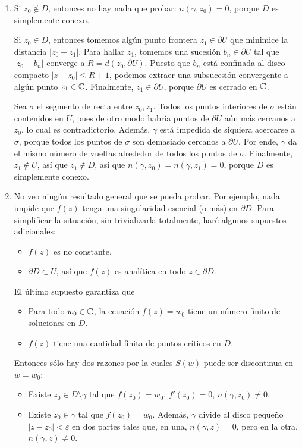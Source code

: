 \begin{solution}
\leavevmode
\begin{enumerate}[label=(\alph*)]
    \item Si $z_0 \notin D$, entonces no hay nada que probar: $n(\gamma, z_0) = 0$, porque $D$ es simplemente conexo.
    
    Si $z_0 \in D$, entonces tomemos algún punto frontera $z_1 \in \partial U$ que minimice la distancia $|z_0 - z_1|$. Para hallar $z_1$, tomemos una sucesión $b_n \in \partial U$ tal que $|z_0 - b_n|$ converge a $R = d(z_0, \partial U)$. Puesto que $b_n$ está confinada al disco compacto $|z - z_0| \le R + 1$, podemos extraer una subsucesión convergente a algún punto $z_1 \in \mathbb C$. Finalmente, $z_1 \in \partial U$, porque $\partial U$ es cerrado en $\mathbb C$.
    
    Sea $\sigma$ el segmento de recta entre $z_0, z_1$. Todos los puntos interiores de $\sigma$ están contenidos en $U$, pues de otro modo habría puntos de $\partial U$ aún más cercanos a $z_0$, lo cual es contradictorio. Además, $\gamma$ está impedida de siquiera acercarse a $\sigma$, porque todos los puntos de $\sigma$ son demasiado cercanos a $\partial U$. Por ende, $\gamma$ da el mismo número de vueltas alrededor de todos los puntos de $\sigma$. Finalmente, $z_1 \notin U$, así que $z_1 \notin D$, así que $n(\gamma, z_0) = n(\gamma, z_1) = 0$, porque $D$ es simplemente conexo.
    
    \item No veo ningún resultado general que se pueda probar. Por ejemplo, nada impide que $f(z)$ tenga una singularidad esencial (o más) en $\partial D$. Para simplificar la situación, sin trivializarla totalmente, haré algunos supuestos adicionales:
    \begin{itemize}
        \item $f(z)$ es no constante.
        \item $\partial D \subset U$, así que $f(z)$ es analítica en todo $z \in \partial D$.
    \end{itemize}
    
    El último supuesto garantiza que
    \begin{itemize}
        \item Para todo $w_0 \in \mathbb C$, la ecuación $f(z) = w_0$ tiene un número finito de soluciones en $D$.
        \item $f(z)$ tiene una cantidad finita de puntos críticos en $D$.
    \end{itemize}
    
    Entonces sólo hay dos razones por la cuales $S(w)$ puede ser discontinua en $w = w_0$:
    \begin{itemize}
        \item Existe $z_0 \in D \setminus \gamma$ tal que $f(z_0) = w_0$, $f'(z_0) = 0$, $n(\gamma, z_0) \ne 0$.
        \item Existe $z_0 \in \gamma$ tal que $f(z_0) = w_0$. Además, $\gamma$ divide al disco pequeño $|z - z_0| < \varepsilon$ en dos partes tales que, en una, $n(\gamma, z) = 0$, pero en la otra, $n(\gamma, z) \ne 0$.
    \end{itemize}
\end{enumerate}
\end{solution}

